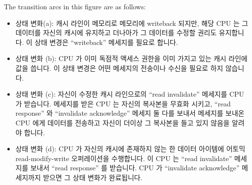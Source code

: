 The transition arcs in this figure are as follows:
\fi
\begin{itemize}
\item	상태 변화(a):
	캐시 라인이 메모리로 메모리에 writeback 되지만, 해당 CPU 는 그 데이터를
	자신의 캐시에 유지하고 더나아가 그 데이터를 수정할 권리도 유지합니다.
	이 상태 변경은 ``writeback'' 메세지를 필요로 합니다.
\item	상태 변화 (b):
	CPU 가 이미 독점적 액세스 권한을 이미 가지고 있는 캐시 라인에 값을
	씁니다.
	이 상태 변경은 어떤 메세지의 전송이나 수신을 필요로 하지 않습니다.
\item	상태 변화 (c):
	자신이 수정한 캐시 라인으로의 ``read invalidate'' 메세지를 CPU 가
	받습니다.
	메세지를 받은 CPU 는 자신의 복사본을 무효화 시키고, ``read response''
	와 ``invalidate acknowledge'' 메세지 둘 다를 보내서 메세지를 보내온 CPU
	에게 데이터를 전송하고 자신이 더이상 그 복사본을 들고 있지 않음을
	알려야 합니다.
\item	상태 변화 (d):
	CPU 가 자신의 캐시에 존재하지 않는 한 데이터 아이템에 어토믹
	read-modify-write 오퍼레이션을 수행합니다.
	이 CPU 는 ``read invalidate'' 메세지를 보내서 ``read response'' 를
	받습니다.
	CPU 가 ``invalidate acknowledge'' 메세지까지 받으면 그 상태 변화가
	완료됩니다.
\iffalse


\end{itemize}

